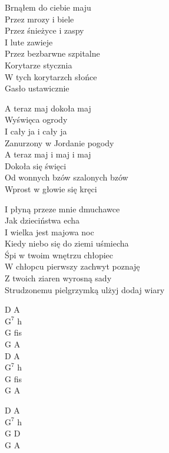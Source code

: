 \begin{text}
    Brnąłem do ciebie maju\\
    Przez mrozy i biele\\
    Przez śnieżyce i zaspy\\
    I lute zawieje\\
    Przez bezbarwne szpitalne\\
    Korytarze stycznia\\
    W tych korytarzch słońce\\
    Gasło ustawicznie

    \vin A teraz maj dokoła maj\\
    \vin Wyświęca ogrody\\
    \vin I cały ja i cały ja\\
    \vin Zanurzony w Jordanie pogody\\
    \vin A teraz maj i maj i maj\\
    \vin Dokoła się święci\\
    \vin Od wonnych bzów szalonych bzów\\
    \vin Wprost w głowie się kręci

    I płyną przeze mnie dmuchawce\\
    Jak dzieciństwa echa\\
    I wielka jest majowa noc\\
    Kiedy niebo się do ziemi uśmiecha\\
    Śpi w twoim wnętrzu chłopiec\\
    W chłopcu pierwszy zachwyt poznaję\\
    Z twoich ziaren wyrosną sady\\
    Strudzonemu pielgrzymką ulżyj dodaj wiary
\end{text}
\begin{chord}
    D A\\
    $\mathrm{G^{7}}$ h\\
    G fis\\
    G A\\
    D A\\
    $\mathrm{G^{7}}$ h\\
    G fis\\
    G A

    D A\\
    $\mathrm{G^{7}}$ h\\
    G D\\
    G A
\end{chord}

